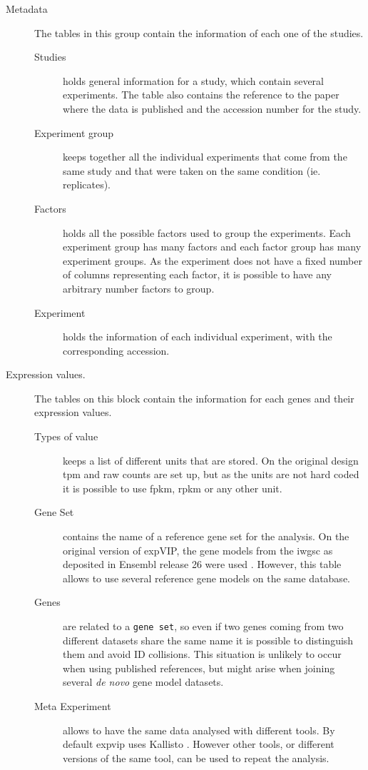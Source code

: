 \begin{description}
\item[Metadata] The tables in this group contain the information of each one of the studies. 
\begin{description}
\item[Studies] holds general information for a study, which contain several experiments. The table also contains the reference to the paper where the data is published and the accession number for the study. 
\item[Experiment group] keeps together all the individual experiments that come from the same study and that were taken on the same condition (ie. replicates). 
\item[Factors] holds all the possible factors used to group the experiments. Each experiment group has many factors and each factor group has many experiment groups. As the experiment does not have a fixed number of columns representing each factor, it is possible to have any arbitrary number factors to group. 
\item[Experiment] holds the information of each individual experiment, with the corresponding accession. 
\end{description}
\item[Expression values.] The tables on this block contain the information for each genes and their expression values. 
\begin{description}
\item[Types of value] keeps a list of different units that are stored. On the original design \acrshort{tpm} and raw counts are set up, but as the units are not hard coded it is possible to use \acrshort{fpkm}, \acrshort{rpkm} or any other unit. 
\item[Gene Set] contains the name of a reference gene set for the analysis. On the original version of expVIP, the gene models from the \acrshort{iwgsc} as deposited in Ensembl release 26 were used \citep{Mayer2014}. However, this table allows to use several reference gene models on the same database. 
\item[Genes] are related to a \texttt{gene set}, so even if two genes coming from two different datasets share the same name it is possible to distinguish them and avoid ID collisions. This situation is unlikely to occur when using published references, but might arise when joining several \textit{de novo} gene model datasets. 
\item[Meta Experiment] allows to have the same data analysed with different tools. By default \gls{expvip} uses Kallisto \citep{Bray2016}. However other tools, or different versions of the same tool, can be used to repeat the analysis.   

\end{description}
\end{description}
